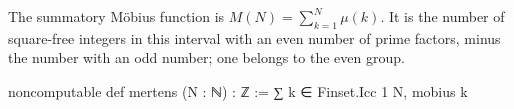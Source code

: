 \begin{definition}
  The summatory M\"obius function is $M(N)=\sum_{k=1}^N\mu(k)$.
  It is the number of square-free integers in this interval with an even number of prime factors,
  minus the number with an odd number; one belongs to the even group.

  \begin{lean}
    noncomputable def mertens (N : ℕ) : ℤ := ∑ k ∈ Finset.Icc 1 N, mobius k
  \end{lean}
\end{definition}
